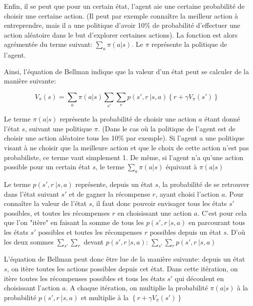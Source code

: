\documentclass[11pt,a4paper]{report}
\begin{document}
    \par Enfin, il se peut que pour un certain état, l'agent aie une certaine probabilité de choisir une certaine action. (Il peut par exemple connaître la meilleur action à entreprendre, mais il a une politique d'avoir 10\% de probabilité d'effectuer une action aléatoire dans le but d'explorer certaines actions). La fonction est alors agrémentée du terme suivant: $\sum_a\pi(a|s)$. Le $\pi$ représente la politique de l'agent.
    
    \par Ainsi, l'équation de Bellman indique que la valeur d'un état peut se calculer de la manière suivante: 
    
    $$V_\pi(s) = \sum_a\pi(a|s)\sum_{s'}\sum_rp(s',r\ |s,a)\left\{r+\gamma V_\pi(s')\right\}$$
    
    \par Le terme $\pi(a|s)$ représente la probabilité de choisir une action $a$ étant donné l'état $s$, suivant une politique $\pi$. (Dans le cas où la politique de l'agent est de choisir une action aléatoire tous les 10\% par exemple). Si l'agent a une politique visant à ne choisir que la meilleure action et que le choix de cette action n'est pas probabiliste, ce terme vaut simplement 1. De même, si l'agent n'a qu'une action possible pour un certain état $s$, le terme $\sum_a\pi(a|s)$ équivaut à $\pi(a|s)$
    
    \par Le terme $p(s',r\ |s,a)$ représente, depuis un état $s$, la probabilité de se retrouver dans l'état suivant $s'$ et de gagner la récompense $r$, ayant choisi l'action $a$. Pour connaître la valeur de l'état $s$, il faut donc pouvoir envisager tous les états $s'$ possibles, et toutes les récompenses $r$ en choisissant une action $a$. C'est pour cela que l'on "itère" en faisant la somme de tous les $p(s',r\ |s,a)$ en parcourant tous les états $s'$ possibles et toutes les récompenses $r$ possibles depuis un état $s$. D'où les deux sommes $\sum_{s'}\sum_r$ devant $p(s',r\ |s,a)$:  $\sum_{s'}\sum_rp(s',r\ |s,a)$
    
    \par L'équation de Bellman peut donc être lue de la manière suivante: depuis un état $s$, on itère toutes les actions possibles depuis cet état. Dans cette itération, on itère toutes les récompenses possibles et tous les états $s'$ qui découlent en choisissant l'action $a$. A chaque itération, on multiplie la probabilité $\pi(a|s)$ à la probabilité $p(s',r\ |s,a)$ et multiplie à la $\left\{r+\gamma V_\pi(s')\right\}$
    
\end{document}
